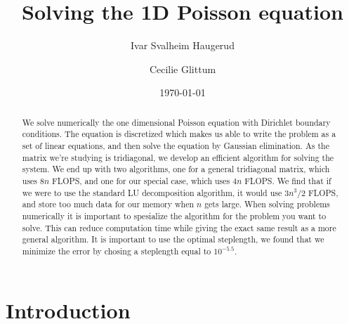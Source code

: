 \documentclass[%
 reprint,
nofootinbib,
 amsmath,amssymb,
 aps,
]{revtex4-1}
\begin{document}

\title{Solving the 1D Poisson equation}%

\author{Ivar Svalheim Haugerud}
\author{Cecilie Glittum}

%


\date{\today}%

\begin{abstract}
We solve numerically the one dimensional Poisson equation with Dirichlet boundary conditions. The equation is discretized which makes us able to write the problem as a set of linear equations, and then solve the equation by Gaussian elimination. As the matrix we're studying is tridiagonal, we develop an efficient algorithm for solving the system. We end up with two algorithms, one for a general tridiagonal matrix, which uses $8n$ FLOPS, and one for our special case, which uses $4n$ FLOPS. We find that if we were to use the standard LU decomposition algorithm, it would use $3n^3/2$ FLOPS, and store too much data for our memory when $n$ gets large. When solving problems numerically it is important to spesialize the algorithm for the problem you want to solve. This can reduce computation time while giving the exact same result as a more general algorithm. It is important to use the optimal steplength, we found that we minimize the error by chosing a steplength equal to $10^{-5.5}$.
\end{abstract}


\maketitle


\section{Introduction}
\end{document}
